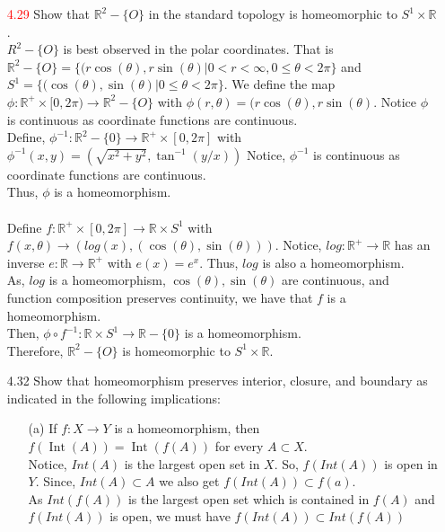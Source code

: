 \documentclass[12pt]{article}
\newcommand{\R}{\mathbb{R}}
\begin{document}
\begin{enumerate}
	\item[\textcolor{red}{4.29}] Show that $\mathbb { R } ^ { 2 } - \{ O \}$ in the standard topology is homeomorphic to $S ^ { 1 } \times \mathbb { R }$.\\
	$ R^2-\{O\} $ is best observed in the polar coordinates. That is $ \R^2-\{O\}=\{(r \cos(\theta),r\sin(\theta)|0<r<\infty, 0\leq \theta < 2\pi\} $ and $ S^1 = \{(\cos(\theta),\sin(\theta)|0\leq\theta<2\pi\} $. We define the map $ \phi : \R^+ \times [0,2\pi) \rightarrow \R^2-\{O\} $ with $ \phi(r,\theta)=(r\cos(\theta),r\sin(\theta) $. Notice $ \phi $ is continuous as coordinate functions are continuous. \\
	Define, $ \phi^{-1}:\R^{2}-\{0\} \rightarrow \R^+ \times [0,2\pi] $ with $ \phi^{-1}(x,y)= (\sqrt{x^2+y^2},\tan^{-1}(y/x)) $ Notice, $ \phi^{-1} $ is continuous as coordinate functions are continuous.\\
	Thus, $ \phi $ is a homeomorphism.\\
	\\
	Define $ f:\R^+\times[0,2\pi]\rightarrow\R\times S^1 $ with $ f(x,\theta) \rightarrow (log(x),(\cos(\theta),\sin(\theta))) $. Notice, $ log:\R^+\rightarrow\R $ has an inverse $ e:\R\rightarrow\R^+ $ with $ e(x)=e^x $. Thus, $ log $ is also a homeomorphism.\\
	As, $ log $ is a homeomorphism, $ \cos(\theta),\sin(\theta) $ are continuous, and function composition preserves continuity, we have that $ f $ is a homeomorphism.\\
	Then, $ \phi \circ f^{-1} : \R\times S^1 \rightarrow \R-\{0\} $ is a homeomorphism.\\
	Therefore,  $\mathbb { R } ^ { 2 } - \{ O \}$ is homeomorphic to $S ^ { 1 } \times \mathbb { R }$.\
	\item[4.32] Show that homeomorphism preserves interior, closure, and boundary as indicated in the following implications:
	\begin{enumerate}
		\item[(a)] If $f : X \rightarrow Y$ is a homeomorphism, then $f ( \operatorname { Int } ( A ) ) = \operatorname { Int } ( f ( A ) )$ for every $A \subset X .$\\
		Notice, $ Int(A) $ is the largest open set in $ X $. So, $ f(Int(A)) $ is open in $ Y $. Since, $ Int(A) \subset A $ we also get $ f(Int(A)) \subset f(a) $. \\
		As $ Int(f(A)) $ is the largest open set which is contained in $ f(A) $ and $ f(Int(A)) $ is open, we must have $ f(Int(A))\subset Int(f(A)) $\\

\end{enumerate}
\end{enumerate}
\end{document}
